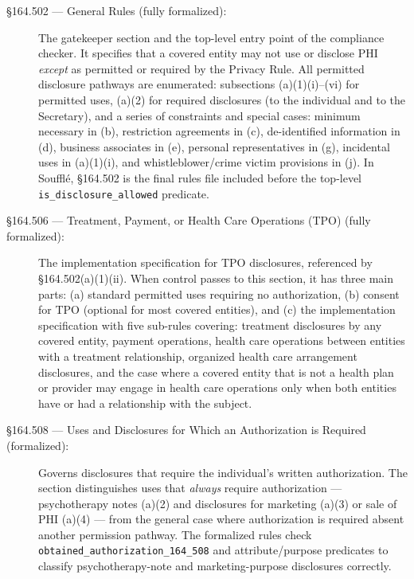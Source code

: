 \documentclass[11pt,letterpaper]{article}
\begin{document}
\begin{description}
  \item[\S 164.502 --- General Rules (fully formalized):]
    The gatekeeper section and the top-level entry point of the compliance checker.
    It specifies that a covered entity may not use or disclose PHI \emph{except} as permitted or
    required by the Privacy Rule. All permitted disclosure pathways are enumerated:
    subsections (a)(1)(i)--(vi) for permitted uses, (a)(2) for required disclosures
    (to the individual and to the Secretary), and a series of constraints and special cases:
    minimum necessary in (b), restriction agreements in (c), de-identified information in (d),
    business associates in (e), personal representatives in (g), incidental uses in (a)(1)(i),
    and whistleblower/crime victim provisions in (j).
    In Souffl\'{e}, \S 164.502 is the final rules file included before the top-level
    \texttt{is\_disclosure\_allowed} predicate.

  \item[\S 164.506 --- Treatment, Payment, or Health Care Operations (TPO) (fully formalized):]
    The implementation specification for TPO disclosures, referenced by \S 164.502(a)(1)(ii).
    When control passes to this section, it has three main parts: (a) standard permitted uses
    requiring no authorization, (b) consent for TPO (optional for most covered entities),
    and (c) the implementation specification with five sub-rules covering: treatment disclosures
    by any covered entity, payment operations, health care operations between entities with a
    treatment relationship, organized health care arrangement disclosures, and the case where a
    covered entity that is not a health plan or provider may engage in health care operations only
    when both entities have or had a relationship with the subject.

  \item[\S 164.508 --- Uses and Disclosures for Which an Authorization is Required (formalized):]
    Governs disclosures that require the individual's written authorization. The section
    distinguishes uses that \emph{always} require authorization --- psychotherapy notes (a)(2)
    and disclosures for marketing (a)(3) or sale of PHI (a)(4) --- from the general case where
    authorization is required absent another permission pathway. The formalized rules check
    \texttt{obtained\_authorization\_164\_508} and attribute/purpose predicates to classify
    psychotherapy-note and marketing-purpose disclosures correctly.


\end{description}
\end{document}
